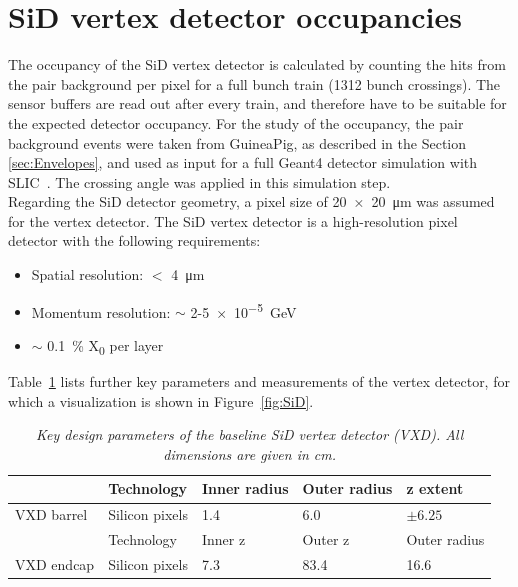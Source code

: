 
\section{SiD vertex detector occupancies}
The occupancy of the SiD vertex detector is calculated by counting the hits from the pair background per pixel for a full bunch train (1312 bunch crossings).
The sensor buffers are read out after every train, and therefore have to be suitable for the expected detector occupancy.
For the study of the occupancy, the pair background events were taken from GuineaPig, as described in the Section \ref{sec:Envelopes}, and used as input for a full Geant4 detector simulation with SLIC~\cite{SLIC}.
The crossing angle was applied in this simulation step.\\
Regarding the SiD detector geometry, a pixel size of \SI{20x20}{\micro\meter} was assumed for the vertex detector.
The SiD vertex detector is a high-resolution pixel detector with the following requirements:
\begin{itemize}
 \item Spatial resolution: $<$ \SI{4}{\micro\meter}
 \item Momentum resolution: $\sim$ 2-\SI{5e-5}{\GeV}
 \item $\sim$ \SI{0.1}{\percent} X\textsubscript{0} per layer
\end{itemize}
Table~\ref{tab:KeyParametersSiD} lists further key parameters and measurements of the vertex detector, for which a visualization is shown in Figure~\ref{fig:SiD}.
\begin{table}[h]
\centering
\begin{tabularx}{\textwidth}{l|llll}
\hline\hline
& Technology & Inner radius & Outer radius & z extent\\
\hline
VXD barrel & Silicon pixels & 1.4 & 6.0 & $\pm 6.25$ \\
\hline\hline
& Technology & Inner z & Outer z & Outer radius\\
\hline
VXD endcap & Silicon pixels & 7.3 & 83.4 & 16.6 \\
\hline\hline
\end{tabularx}
\caption{\textit{Key design parameters of the baseline SiD vertex detector (VXD). All dimensions are given in cm.}}
\label{tab:KeyParametersSiD}
\end{table}

